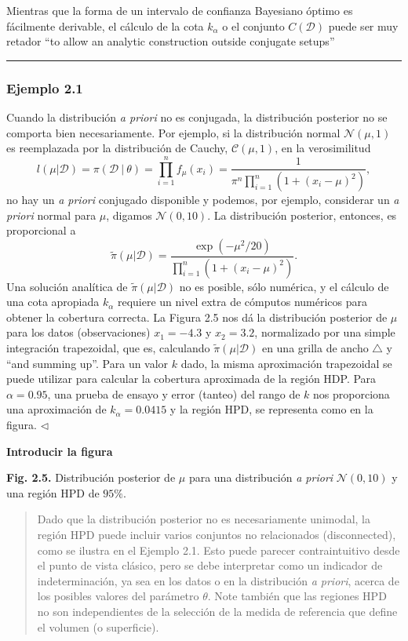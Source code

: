 \documentclass[12pt,]{article}
\begin{document}
Mientras que la forma de un intervalo de confianza Bayesiano óptimo es
fácilmente derivable, el cálculo de la cota \(k_\alpha\) o el conjunto
\(C(\mathcal{D})\) puede ser muy retador ``to allow an analytic
construction outside conjugate setups''

\begin{center}\rule{0.5\linewidth}{\linethickness}\end{center}

\subsubsection{Ejemplo 2.1}\label{ejemplo-2.1}

Cuando la distribución \emph{a priori} no es conjugada, la distribución
posterior no se comporta bien necesariamente. Por ejemplo, si la
distribución normal \(\mathcal{N}(\mu,1)\) es reemplazada por la
distribución de Cauchy, \(\mathcal{C}(\mu,1)\), en la verosimilitud \[
l(\mu|\mathcal{D})=\pi(\mathcal{D}\ |\ \theta)=\prod_{i=1}^{n}f_\mu(x_i)=\frac{1}{\pi^n\prod_{i=1}^n(1+(x_i-\mu)^2)},
\] no hay un \emph{a priori} conjugado disponible y podemos, por
ejemplo, considerar un \emph{a priori} normal para \(\mu\), digamos
\(\mathcal{N}(0,10)\). La distribución posterior, entonces, es
proporcional a \[
\tilde\pi(\mu|\mathcal{D})=\frac{\exp(-\mu^2/20)}{\prod_{i=1}^{n}(1+(x_i-\mu)^2)}.
\] Una solución analítica de \(\tilde\pi(\mu|\mathcal{D})\) no es
posible, sólo numérica, y el cálculo de una cota apropiada \(k_\alpha\)
requiere un nivel extra de cómputos numéricos para obtener la cobertura
correcta. La Figura 2.5 nos dá la distribución posterior de \(\mu\) para
los datos (observaciones) \(x_1=-4.3\) y \(x_2=3.2\), normalizado por
una simple integración trapezoidal, que es, calculando
\(\tilde\pi(\mu|\mathcal{D})\) en una grilla de ancho \(\triangle\) y
``and summing up''. Para un valor \(k\) dado, la misma aproximación
trapezoidal se puede utilizar para calcular la cobertura aproximada de
la región HDP. Para \(\alpha=0.95\), una prueba de ensayo y error
(tanteo) del rango de \(k\) nos proporciona una aproximación de
\(k_\alpha=0.0415\) y la región HPD, se representa como en la figura.
\(\lhd\)

\textbf{Introducir la figura}

\textbf{Fig. 2.5.} Distribución posterior de \(\mu\) para una
distribución \emph{a priori} \(\mathcal{N}(0,10)\) y una región HPD de
\(95\%\).

\begin{quote}
Dado que la distribución posterior no es necesariamente unimodal, la
región HPD puede incluir varios conjuntos no relacionados
(disconnected), como se ilustra en el Ejemplo 2.1. Esto puede parecer
contraintuitivo desde el punto de vista clásico, pero se debe
interpretar como un indicador de indeterminación, ya sea en los datos o
en la distribución \emph{a priori}, acerca de los posibles valores del
parámetro \(\theta\). Note también que las regiones HPD no son
independientes de la selección de la medida de referencia que define el
volumen (o superficie).
\end{quote}
\end{document}
